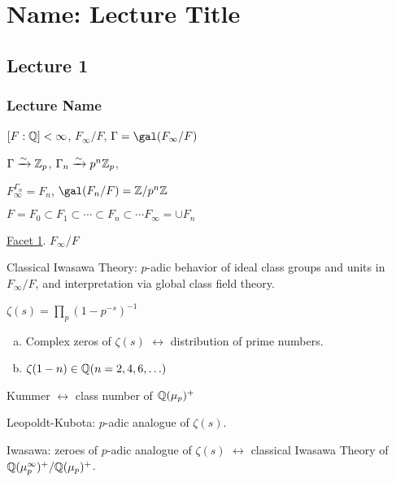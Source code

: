 \newpage
\section{Name: Lecture Title}
\subsection{Lecture 1}
\subsubsection{Lecture Name}

$[F:\mathbb{Q}]<\infty$, $F_\infty/F$, $\Gamma=\gal(F_\infty/F)$

$\Gamma \xrightarrow{\sim} \mathbb{Z}_p$, $\Gamma_n \xrightarrow{\sim} p^n \mathbb{Z}_p$,

$F_\infty^{\Gamma_n}=F_n$, $\gal(F_n/F)=\Z/p^n\Z$

$F=F_0 \subset F_1 \subset \cdots \subset F_n \subset \cdots F_\infty= \cup F_n$

\underline{Facet 1}. $F_\infty/F$

Classical Iwasawa Theory: $p$-adic behavior of ideal class groups and units in $F_\infty/F$, and interpretation via global class field theory. 

$\zeta(s)= \prod_p (1-p^{-s})^{-1}$
\begin{enumerate}[(a)]
\item Complex zeros of $\zeta(s)$ $\leftrightarrow$ distribution of prime numbers.
\item $\zeta(1-n) \in \mathbb{Q}(n=2,4,6,\ldots)$
\end{enumerate}

Kummer $\leftrightarrow$ class number of $\mathbb{Q}(\mu_p)^+$

Leopoldt-Kubota: $p$-adic analogue of $\zeta(s)$.

Iwasawa: zeroes of $p$-adic analogue of $\zeta(s)$ $\leftrightarrow$ classical Iwasawa Theory of $\mathbb{Q}(\mu_p^{\infty})^+/\mathbb{Q}(\mu_p)^+$.